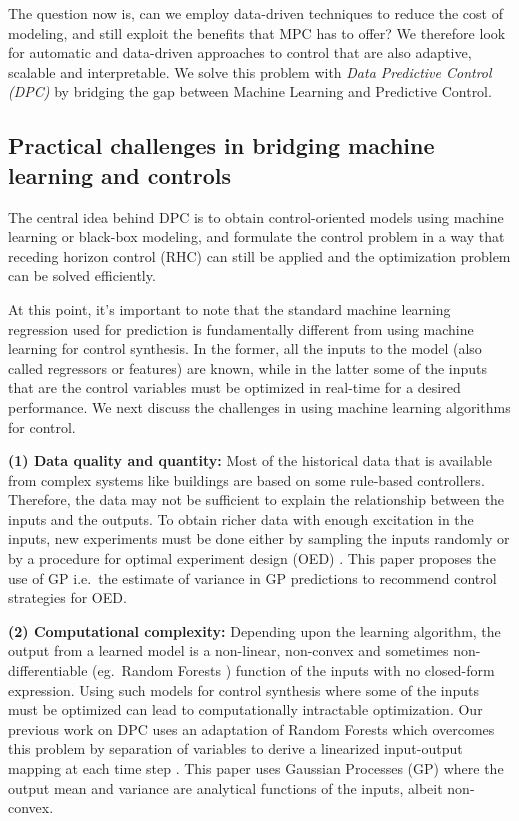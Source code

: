 The question now is, can we employ data-driven techniques to reduce the cost of modeling, and still exploit the benefits that MPC has to offer? We therefore look for automatic and data-driven approaches to control that are also adaptive, scalable and interpretable. We solve this problem with \textit{Data Predictive Control (DPC)} by bridging the gap between Machine Learning and Predictive Control.

\subsection{Practical challenges in bridging machine learning and controls}
\label{SS:practical_challenges}

The central idea behind DPC is to obtain control-oriented models using machine learning or black-box modeling, and formulate the control problem in a way that receding horizon control (RHC) can still be applied and the optimization problem can be solved efficiently.

At this point, it's important to note that the standard machine learning regression used for prediction is fundamentally different from using machine learning for control synthesis. In the former, all the inputs to the model (also called regressors or features) are known, while in the latter some of the inputs that are the control variables must be optimized in real-time for a desired performance. We next discuss the challenges in using machine learning algorithms for control.

\noindent \textbf{(1) Data quality and quantity:} Most of the historical data that is available from complex systems like buildings are based on some rule-based controllers. Therefore, the data may not be sufficient to explain the relationship between the inputs and the outputs. To obtain richer data with enough excitation in the inputs, new experiments must be done either by sampling the inputs randomly or by a procedure for optimal experiment design (OED) \cite{Emery1998,Fedorov2010}. This paper proposes the use of GP i.e.~the estimate of variance in GP predictions to recommend control strategies for OED.

\noindent \textbf{(2) Computational complexity:} Depending upon the learning algorithm, the output from a learned model is a non-linear, non-convex and sometimes non-differentiable (eg.~Random Forests \cite{Friedman2001}) function of the inputs with no closed-form expression. Using such models for control synthesis where some of the inputs must be optimized can lead to computationally intractable optimization. Our previous work on DPC uses an adaptation of Random Forests which overcomes this problem by separation of variables to derive a linearized input-output mapping at each time step \cite{JainACC2017,JainCDC2017}.
This paper uses Gaussian Processes (GP) where the output mean and variance are analytical functions of the inputs, albeit non-convex.


